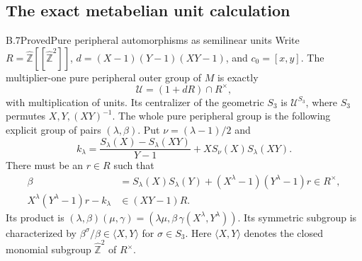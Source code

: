 \subsection{The exact metabelian unit calculation}

\begin{statement}{B.7}{Proved}{Pure peripheral automorphisms as semilinear units}
Write $R=\widehat{\mathbb Z}[[\widehat{\mathbb Z}^2]]$,
$d=(X-1)(Y-1)(XY-1)$, and $c_0=[x,y]$.
The multiplier-one pure peripheral outer group of $M$ is exactly
\[
                 \mathcal U=(1+dR)\cap R^\times,
\]
with multiplication of units. Its centralizer of the geometric
$S_3$ is $\mathcal U^{S_3}$, where $S_3$ permutes
$X,Y,(XY)^{-1}$. The whole pure peripheral group is the following
explicit group of pairs $(\lambda,\beta)$.
Put $\nu=(\lambda-1)/2$ and
\[
 k_\lambda=\frac{S_\lambda(X)-S_\lambda(XY)}{Y-1}
                     +X S_\nu(X)S_\lambda(XY).
\]
There must be an $r\in R$ such that
\[
 \begin{split}
 \beta&=S_\lambda(X)S_\lambda(Y)
                  +(X^\lambda-1)(Y^\lambda-1)r\in R^\times,\\
 X^\lambda(Y^\lambda-1)r-k_\lambda&\in (XY-1)R.
 \end{split}
\]
Its product is
$(\lambda,\beta)(\mu,\gamma)
=(\lambda\mu,\beta\,\gamma(X^\lambda,Y^\lambda))$.
Its symmetric subgroup is characterized by
$\beta^\sigma/\beta\in\langle X,Y\rangle$ for $\sigma\in S_3$.
Here $\langle X,Y\rangle$ denotes the closed monomial subgroup
$\widehat{\mathbb Z}^2$ of $R^\times$.
\end{statement}
